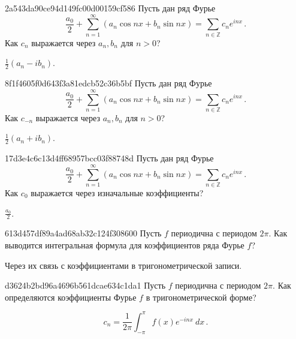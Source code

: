 \begin{note}{2a543da90ce94d149fc00d00159cf586}
    Пусть дан ряд Фурье
    \[
        \frac{a_0}{2} + \sum_{n=1}^{\infty} (a_n \cos nx + b_n \sin nx) = \sum_{n \in \mathbb Z} c_n e^{i nx}\,.
    \]
    Как \({ c_n }\) выражается через \({ a_n, b_n }\) для \({ n > 0 }\)?

    \begin{cloze}{1}
        \({ \frac{1}{2}(a_n - ib_n) }\).
    \end{cloze}
\end{note}

\begin{note}{8f1f4605f0d643f3a81edcb52c36b5bf}
    Пусть дан ряд Фурье
    \[
        \frac{a_0}{2} + \sum_{n=1}^{\infty} (a_n \cos nx + b_n \sin nx) = \sum_{n \in \mathbb Z} c_n e^{i nx}\,.
    \]
    Как \({ c_{-n} }\) выражается через \({ a_n, b_n }\) для \({ n > 0 }\)?

    \begin{cloze}{1}
        \({ \frac{1}{2}(a_n + ib_n) }\).
    \end{cloze}
\end{note}

\begin{note}{17d3e4c6c13d4ff68957bcc03f88748d}
    Пусть дан ряд Фурье
    \[
        \frac{a_0}{2} + \sum_{n=1}^{\infty} (a_n \cos nx + b_n \sin nx) = \sum_{n \in \mathbb Z} c_n e^{i nx}\,.
    \]
    Как \({ c_0 }\) выражается через изначальные коэффициенты?

    \begin{cloze}{1}
        \({ \frac{a_0}{2} }\).
    \end{cloze}
\end{note}

\begin{note}{613d457df89a4ad68ab32c124f308600}
    Пусть \({ f }\) периодична с периодом \({ 2\pi }\).
    Как выводится интегральная формула для коэффициентов ряда Фурье \({ f }\)?

    \begin{cloze}{1}
        Через их связь с коэффициентами в тригонометрической записи.
    \end{cloze}
\end{note}

\begin{note}{d3624b2bd96a4696b561dcae634c1da1}
    Пусть \({ f }\) периодична с периодом \({ 2\pi }\).
    Как определяются коэффициенты Фурье \({ f }\) в тригонометрической форме?

    \begin{cloze}{1}
        \[
            c_n = \frac{1}{2\pi} \int_{-\pi}^{\pi} f(x) e^{-i nx}\: dx\,.
        \]
    \end{cloze}
\end{note}

